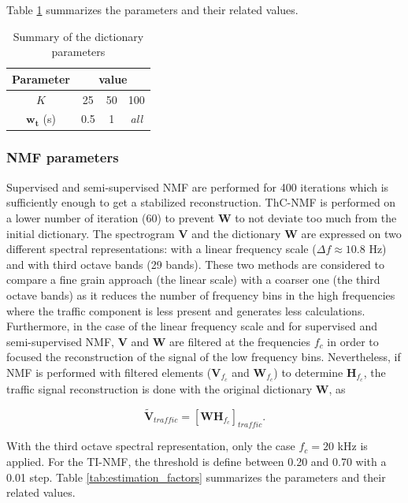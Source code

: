 \documentclass[twocolumn,a4paper,10pt]{article}
\begin{document}
Table \ref{tab:dictionary_factors} summarizes the parameters and their related values.

\begin{table}[h]
\centering
\begin{tabular}{cccc}
Parameter &  \multicolumn{3}{c}{value}\\ \hline
$K$ & 25  & 50 & 100 \\ \hline
$\mathbf{w_t}$ (s)& 0.5 & 1  & \textit{all}
\end{tabular}
\caption{Summary of the dictionary parameters}
\label{tab:dictionary_factors}
\end{table}

\subsubsection{NMF parameters}

Supervised and semi-supervised NMF are performed for 400 iterations which is sufficiently enough to get a stabilized reconstruction. ThC-NMF is performed on a lower number of iteration (60) to prevent $\mathbf{W}$ to not deviate too much from the initial dictionary. The spectrogram $\mathbf{V}$ and the dictionary $\mathbf{W}$ are expressed on two different spectral representations: with a linear frequency scale ($\Delta f \approx 10.8$ Hz) and with third octave bands (29 bands). These two methods are considered to compare a fine grain approach (the linear scale) with a coarser one (the third octave bands) as it reduces the number of frequency bins in the high frequencies where the traffic component is less present and generates less calculations. Furthermore, in the case of the linear frequency scale and for supervised and semi-supervised NMF, $\mathbf{V}$ and $\mathbf{W}$ are filtered at the frequencies $f_c$ in order to focused the reconstruction of the signal of the low frequency bins. Nevertheless, if NMF is performed with filtered elements ($\mathbf{V}_{f_c}$ and $\mathbf{W}_{f_c}$) to determine $\mathbf{H}_{f_c}$, the traffic signal reconstruction is done with the original dictionary $\mathbf{W}$, as

\begin{equation}
\mathbf{\tilde{V}}_{traffic} = \left[\mathbf{WH}_{f_c}\right]_{traffic}.
\end{equation}

With the third octave spectral representation, only the case $f_c = 20$ kHz is applied. For the TI-NMF, the threshold is define between 0.20 and 0.70 with a 0.01 step. Table \ref{tab:estimation_factors} summarizes the parameters and their related values.
\end{document}
